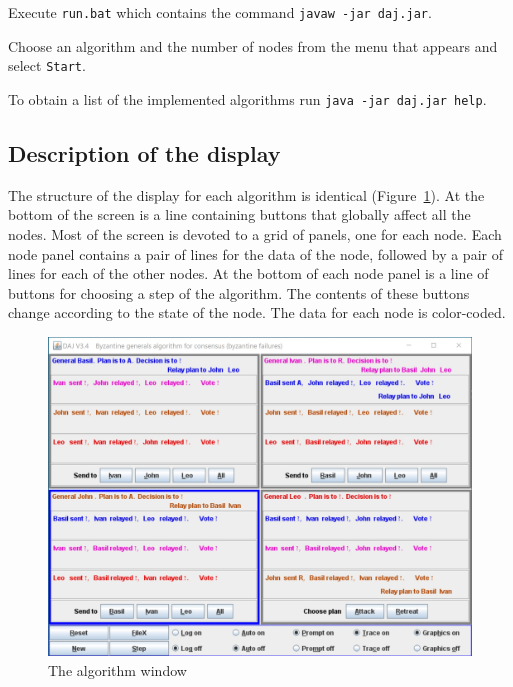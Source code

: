 \documentclass[11pt]{article}
\newcommand{\p}[1]{\texttt{#1}}
\begin{document}
Execute \p{run.bat} which contains the command \p{javaw -jar daj.jar}.

Choose an algorithm and the number of nodes from the menu that appears
and select \p{Start}.

To obtain a list of the implemented algorithms run \p{java -jar daj.jar help}.

\subsection{Description of the display}
The structure of the display for each algorithm is identical (Figure~\ref{fig1}).
At the bottom of the screen is a line containing buttons that globally affect
all the nodes.
Most of the screen is devoted to a grid of panels, one for each node.
Each node panel contains a pair of lines for the data of the node, followed
by a pair of lines for each of the other nodes.
At the bottom of each node panel is a line of buttons for choosing a step
of the algorithm. The contents of these buttons change according to the
state of the node.
The data for each node is color-coded.

\begin{figure}[t]
\begin{center}
\includegraphics[width=15cm,keepaspectratio=true]{daj.jpg}
\end{center}
\caption{The algorithm window}\label{fig1}
\end{figure}
\end{document}

